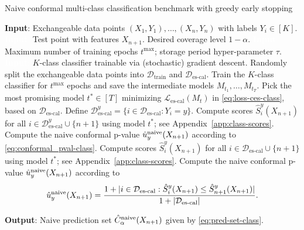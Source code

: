 \begin{algorithm}[H]
    \caption{Naive conformal multi-class classification benchmark with greedy early stopping}
    \label{alg:naive-multi}
    \begin{algorithmic}[1]
        \STATE \textbf{Input}: Exchangeable data points $(X_{1},Y_{1}), \ldots, (X_{n},Y_{n})$ with labels $Y_i \in [K]$.
        \STATE \textcolor{white}{\textbf{Input}:} Test point with features $X_{n+1}$. Desired coverage level $1-\alpha$.
        \STATE \textcolor{white}{\textbf{Input}:} Maximum number of training epochs $t^{\text{max}}$; storage period hyper-parameter $\tau$.
        \STATE \textcolor{white}{\textbf{Input}:} $K$-class classifier trainable via (stochastic) gradient descent.
        \STATE Randomly split the exchangeable data points into $\mathcal{D}_{\text{train}}$ and $\mathcal{D}_{\text{es-cal}}$.
        \STATE Train the $K$-class classifier for $t^{\text{max}}$ epochs and save the intermediate models $M_{t_1} , \dots, M_{t_T}$.
        \STATE Pick the most promising model $t^* \in [T]$ minimizing $\mathcal{L}_{\text{es-cal}}(M_t)$ in \eqref{eq:loss-ces-class}, based on $\mathcal{D}_{\text{es-cal}}$.
        \STATE Define $\mathcal{D}^y_{\text{es-cal}} = \{i \in \mathcal{D}_{\text{es-cal}} : Y_i = y \}$.
        \STATE Compute scores $\hat{S}_i^y(X_{n+1})$ for all $i \in \mathcal{D}^y_{\text{es-cal}} \cup \{n+1\}$ using model $t^*$; see Appendix~\ref{app:class-scores}.
        \STATE Compute the naive conformal p-value $\hat{u}^{\textup{naive}}_y(X_{n+1})$ according to \eqref{eq:conformal_pval-class}.
        \ELSE
        \STATE Compute scores $\hat{S}_i^y(X_{n+1})$ for all $i \in \mathcal{D}_{\text{es-cal}} \cup \{n+1\}$ using model $t^*$; see Appendix~\ref{app:class-scores}.
        \STATE Compute the naive conformal p-value $\hat{u}^{\textup{naive}}_y(X_{n+1})$ according to
        \begin{align*}
          \hat{u}^{\textup{naive}}_y(X_{n+1}) = \frac{1 + |i \in \mathcal{D}_{\text{es-cal}}: \hat{S}_{i}^y(X_{n+1}) \leq \hat{S}_{n+1}^y(X_{n+1})|}{1+|\mathcal{D}_{\text{es-cal}}|}.
        \end{align*}
        \ENDIF
        \ENDFOR

        \STATE \textbf{Output}: Naive prediction set $\hat{C}^{\textup{naive}}_{\alpha}(X_{n+1})$ given by \eqref{eq:pred-set-class}.
    \end{algorithmic}
\end{algorithm}



